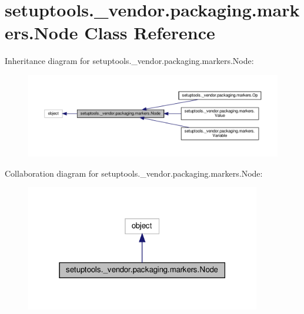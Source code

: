 \hypertarget{classsetuptools_1_1__vendor_1_1packaging_1_1markers_1_1Node}{}\section{setuptools.\+\_\+vendor.\+packaging.\+markers.\+Node Class Reference}
\label{classsetuptools_1_1__vendor_1_1packaging_1_1markers_1_1Node}


Inheritance diagram for setuptools.\+\_\+vendor.\+packaging.\+markers.\+Node\+:
\nopagebreak
\begin{figure}[H]
\begin{center}
\leavevmode
\includegraphics[width=350pt]{classsetuptools_1_1__vendor_1_1packaging_1_1markers_1_1Node__inherit__graph}
\end{center}
\end{figure}


Collaboration diagram for setuptools.\+\_\+vendor.\+packaging.\+markers.\+Node\+:
\nopagebreak
\begin{figure}[H]
\begin{center}
\leavevmode
\includegraphics[width=291pt]{classsetuptools_1_1__vendor_1_1packaging_1_1markers_1_1Node__coll__graph}
\end{center}
\end{figure}
